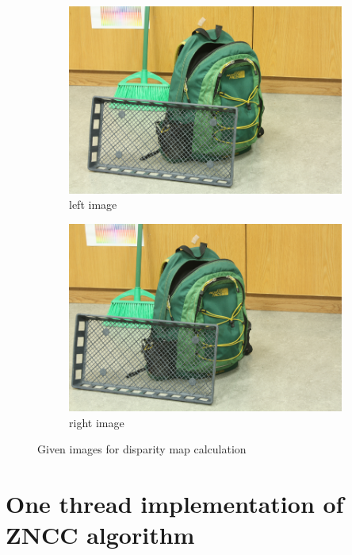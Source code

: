 \documentclass[conference]{IEEEtran}
\begin{document}
\begin{figure}[t!]
\centering
	\begin{subfigure}{0.49\linewidth}
		\centering
		\includegraphics[scale=0.15]{./figures/im_left.png}
 		\caption{left image}
	\end{subfigure}
	\begin{subfigure}{0.49\linewidth}
		\centering
		\includegraphics[scale=0.15]{./figures/im_right.png}
 		\caption{right image}
	\end{subfigure}
\caption{Given images for disparity map calculation}\label{fig:givenImages}
\end{figure}

\section{One thread implementation of ZNCC algorithm}\label{sec:CbasedImplementation}
\end{document}
